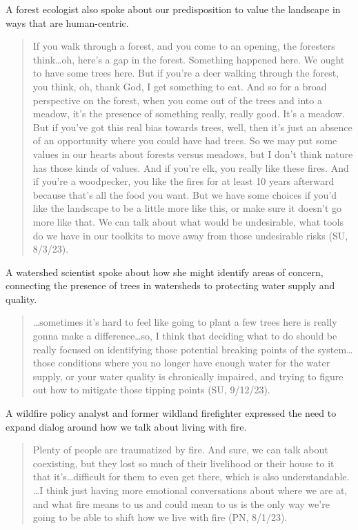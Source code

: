 \documentclass[
]{article}
\begin{document}
A forest ecologist also spoke about our predisposition to value the landscape in ways that are human-centric.

\begin{quote}
If you walk through a forest, and you come to an opening, the foresters think\ldots oh, here's a gap in the forest. Something happened here. We ought to have some trees here. But if you're a deer walking through the forest, you think, oh, thank God, I get something to eat. And so for a broad perspective on the forest, when you come out of the trees and into a meadow, it's the presence of something really, really good. It's a meadow. But if you've got this real bias towards trees, well, then it's just an absence of an opportunity where you could have had trees. So we may put some values in our hearts about forests versus meadows, but I don't think nature has those kinds of values. And if you're elk, you really like these fires. And if you're a woodpecker, you like the fires for at least 10 years afterward because that's all the food you want. But we have some choices if you'd like the landscape to be a little more like this, or make sure it doesn't go more like that. We can talk about what would be undesirable, what tools do we have in our toolkits to move away from those undesirable risks (SU, 8/3/23).
\end{quote}

A watershed scientist spoke about how she might identify areas of concern, connecting the presence of trees in watersheds to protecting water supply and quality.

\begin{quote}
\ldots sometimes it's hard to feel like going to plant a few trees here is really gonna make a difference\ldots so, I think that deciding what to do should be really focused on identifying those potential breaking points of the system\ldots those conditions where you no longer have enough water for the water supply, or your water quality is chronically impaired, and trying to figure out how to mitigate those tipping points (SU, 9/12/23).
\end{quote}

A wildfire policy analyst and former wildland firefighter expressed the need to expand dialog around how we talk about living with fire.

\begin{quote}
Plenty of people are traumatized by fire. And sure, we can talk about coexisting, but they lost so much of their livelihood or their house to it that it's\ldots difficult for them to even get there, which is also understandable. \ldots I think just having more emotional conversations about where we are at, and what fire means to us and could mean to us is the only way we're going to be able to shift how we live with fire (PN, 8/1/23).
\end{quote}
\end{document}

